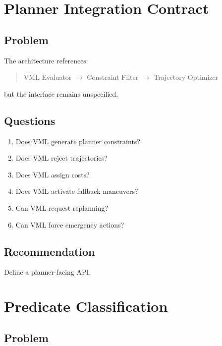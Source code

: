 \documentclass[a4paper,11pt]{article}
\begin{document}
\section{Planner Integration Contract}

\subsection{Problem}

The architecture references:

\begin{quote}
VML Evaluator $\rightarrow$
Constraint Filter $\rightarrow$
Trajectory Optimizer
\end{quote}

but the interface remains unspecified.

\subsection{Questions}

\begin{enumerate}

\item Does VML generate planner constraints?

\item Does VML reject trajectories?

\item Does VML assign costs?

\item Does VML activate fallback maneuvers?

\item Can VML request replanning?

\item Can VML force emergency actions?
\end{enumerate}

\subsection{Recommendation}

Define a planner-facing API.

\section{Predicate Classification}

\subsection{Problem}
\end{document}
